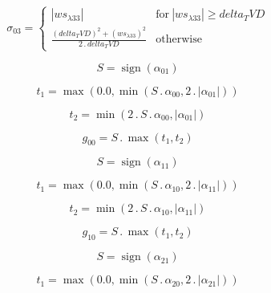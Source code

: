 \documentclass{article}
\begin{document}
\begin{dmath}\sigma_{0 3} = \begin{cases} \left|{ws_{\lambda 33}}\right| & \text{for}\: \left|{ws_{\lambda 33}}\right| \geq delta_TVD \\\frac{\left(delta_TVD \right)^{2} + \left(ws_{\lambda 33} \right)^{2}}{2 \,.\, delta_TVD} & \text{otherwise} 
\end{cases}\end{dmath}

\begin{dmath}S = \operatorname{sign}{\left (\alpha_{01} \right )}\end{dmath}

\begin{dmath}t_{1} = \max\left(0.0, \min\left(S \,.\, \alpha_{00}, 2 \,.\, \left|{\alpha_{01}}\right|\right)\right)\end{dmath}

\begin{dmath}t_{2} = \min\left(2 \,.\, S \,.\, \alpha_{00}, \left|{\alpha_{01}}\right|\right)\end{dmath}

\begin{dmath}g_{00} = S \,.\, \max\left(t_{1}, t_{2}\right)\end{dmath}

\begin{dmath}S = \operatorname{sign}{\left (\alpha_{11} \right )}\end{dmath}

\begin{dmath}t_{1} = \max\left(0.0, \min\left(S \,.\, \alpha_{10}, 2 \,.\, \left|{\alpha_{11}}\right|\right)\right)\end{dmath}

\begin{dmath}t_{2} = \min\left(2 \,.\, S \,.\, \alpha_{10}, \left|{\alpha_{11}}\right|\right)\end{dmath}

\begin{dmath}g_{10} = S \,.\, \max\left(t_{1}, t_{2}\right)\end{dmath}

\begin{dmath}S = \operatorname{sign}{\left (\alpha_{21} \right )}\end{dmath}

\begin{dmath}t_{1} = \max\left(0.0, \min\left(S \,.\, \alpha_{20}, 2 \,.\, \left|{\alpha_{21}}\right|\right)\right)\end{dmath}
\end{document}

